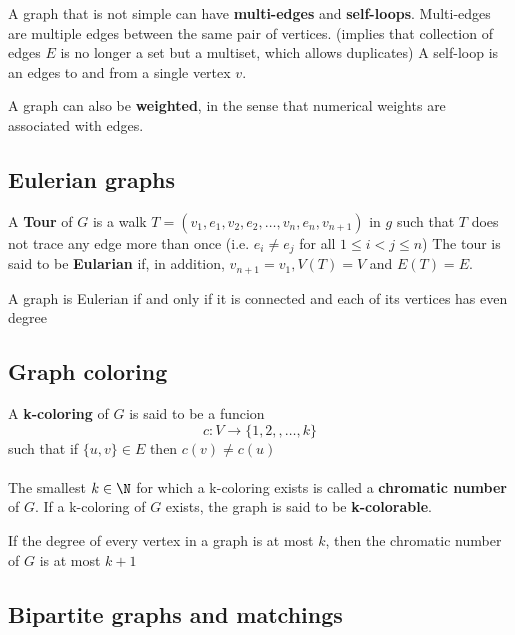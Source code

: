 \documentclass[11pt]{article}
\begin{document}
$ $\\
A graph that is not simple can have \textbf{multi-edges} and \textbf{self-loops}. Multi-edges are multiple edges between the same pair of vertices. (implies that collection of edges $E$ is no longer a set but a multiset, which allows duplicates) A self-loop is an edges to and from a single vertex $v$.

$ $\\
A graph can also be \textbf{weighted}, in the sense that numerical weights are associated with edges.



\subsection*{Eulerian graphs}

A \textbf{Tour} of $G$ is a walk $T = (v_1, e_1, v_2, e_2, \dots, v_n, e_n, v_{n+1})$ in $g$ such that $T$ does not trace any edge more than once (i.e. $e_i \neq e_j$ for all $1\leq i < j \leq n$) The tour is said to be \textbf{Eularian} if, in addition, $v_{n+1} = v_1, V(T) = V$ and $E(T) = E$.

\begin{theorem*}
  A graph is Eulerian if and only if it is connected and each of its vertices has even degree
\end{theorem*}


\subsection*{Graph coloring}

A \textbf{k-coloring} of $G$ is said to be a funcion
\[
  c: V\to \{ 1,2,, \dots , k\}
\]
such that if $\{ u,v\}\in E$ then $c(v) \neq c(u)$\\\\
The smallest $k\in \N$ for which a k-coloring exists is called a
\textbf{chromatic number} of $G$. If a k-coloring of $G$ exists, the graph is said to be \textbf{k-colorable}.

\begin{proposition*}
  If the degree of every vertex in a graph is at most $k$, then the chromatic number of $G$ is at most $k+1$
\end{proposition*}


\subsection*{Bipartite graphs and matchings}
\end{document}
